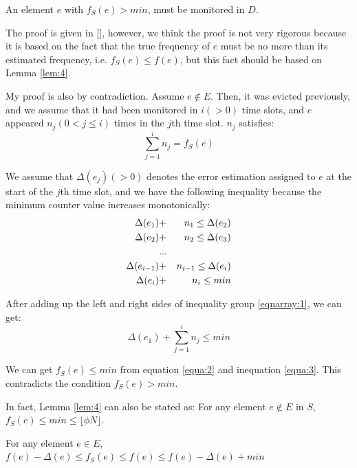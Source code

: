 \documentclass[conference]{IEEEtran}
\begin{document}
\begin{lemma}\label{lem:4}
	An element $e$ with $f_S(e)> min$, must be monitored in $D$.
\end{lemma}

\begin{IEEEproof}
The proof is given in [], however, we think the proof is not very rigorous because it is based on the fact that the true frequency of $e$ must be no more than its estimated frequency, i.e. $f_S(e)\leq f(e)$, but this fact should be based on Lemma \ref{lem:4}.\par
My proof is also by contradiction. Assume $e\notin E$. Then, it was evicted previously, and we assume that it had been monitored in $i(>0)$ time slots, and $e$ appeared $n_j(0<j\leq i)$ times in the $j$th time slot. $n_j$ satisfies:
\begin{equation}\label{equa:2}
\sum_{j=1}^{i}n_j=f_S(e)
\end{equation}\par
We assume that $\Delta(e_j)(>0)$ denotes the error estimation assigned to $e$ at the start of the $j$th time slot, and we have the following inequality because the minimum counter value increases monotonically:
\setlength{\arraycolsep}{0.0em}
\begin{eqnarray}\label{eqnarray:1}
\Delta(e_1)&+&n_1\leq\Delta(e_2)\notag\\
\Delta(e_2)&+&n_2\leq\Delta(e_3)\notag\\
&...&\\
\Delta(e_{i-1})&+&n_{i-1}\leq\Delta(e_i)\notag\\
\Delta(e_i)&+&n_i\leq min \notag
\end{eqnarray}\par
\setlength{\arraycolsep}{5pt}
After adding up the left and right sides of inequality group \ref{eqnarray:1}, we can get:
\begin{equation}\label{equa:3}
\Delta(e_1)+\sum_{j=1}^{i}n_j\leq min
\end{equation}\par
We can get $f_S(e)\leq min$ from equation \ref{equa:2} and inequation \ref{equa:3}. This contradicts the condition $f_S(e)>min$.\par
In fact, Lemma \ref{lem:4} can also be stated as: For any element $e\notin E$ in $S$, $f_S(e)\leq min\leq \lfloor\phi N\rfloor$.  
\end{IEEEproof}

\begin{lemma}\label{lem:5}
  For any element $e\in E$, $f(e)-\Delta(e)\leq f_S(e)\leq f(e)\leq f(e)-\Delta(e)+min$
\end{lemma}
\end{document}
